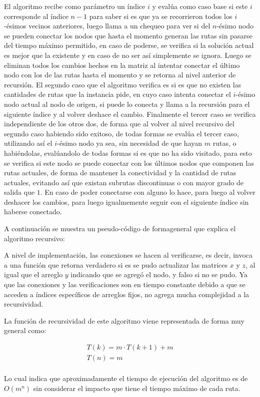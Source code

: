 El algoritmo recibe como par\'ametro un \'indice $i$ y eval\'ua como caso base si este $i$ corresponde al \'indice $n-1$ para saber si es que ya se recorrieron todos los $i$-\'esimos vecinos anteriores, luego llama a un chequeo para ver si del $n$-\'esimo nodo se pueden conectar los nodos que hasta el momento generan las rutas sin pasarse del tiempo m\'aximo permitido, en caso de poderse, se verifica si la soluci\'on actual es mejor que la existente y en caso de no ser as\'i simplemente se ignora. Luego se eliminan todos los cambios hechos en la matriz al intentar conectar el \'ultimo nodo con los de las rutas hasta el momento y se retorna al nivel anterior de recursi\'on. El segundo caso que el algoritmo verifica es si es que no existen las cantidades de rutas que la instancia pide, en cuyo caso intenta conectar el $i$-\'esimo nodo actual al nodo de origen, si puede lo conecta y llama a la recursi\'on para el siguiente \'indice y al volver deshace el cambio. Finalmente el tercer caso se verifica independiente de los otros dos, de forma que al volver al nivel recursivo del segundo caso habiendo sido exitoso, de todas formas se eval\'ua el tercer caso, utilizando as\'i el $i$-\'esimo nodo ya sea, sin necesidad de que hayan $m$ rutas, o habi\'endolas, eval\'uandolo de todas formas si es que no ha sido visitado, para esto se verifica si este nodo se puede conectar con los \'ultimos nodos que componen las rutas actuales, de forma de mantener la conectividad y la cantidad de rutas actuales, evitando as\'i que existan subrutas discontinuas o con mayor grado de salida que $1$. En caso de poder conectarse con alguno lo hace, para luego al volver deshacer los cambios, para luego igualmemente seguir con el siguiente \'indice sin haberse conectado.

A continuaci\'on se muestra un pseudo-c\'odigo de formageneral que explica el algoritmo recursivo:



A nivel de implementaci\'on, las conexiones se hacen al verificarse, es decir, invoca a una funci\'on que retorna verdadero si es se pudo actualizar las matrices $x$ y $z$, al igual que el arreglo $y$ indicando que se agreg\'o el nodo, y falso si no se pudo. Ya que las conexiones y las verificaciones son en tiempo constante debido a que se acceden a \'indices espec\'ificos de arreglos fijos, no agrega mucha complejidad a la recursividad.

La funci\'on de recursividad de este algoritmo viene representada de forma muy general como:

\begin{align*}
    T(k) = m·T(k+1) + m\\
    T(n) = m\\
\end{align*}

Lo cual indica que aproximadamente el tiempo de ejecuci\'on del algoritmo es de $O(m^n)$ sin considerar el impacto que tiene el tiempo m\'aximo de cada ruta.